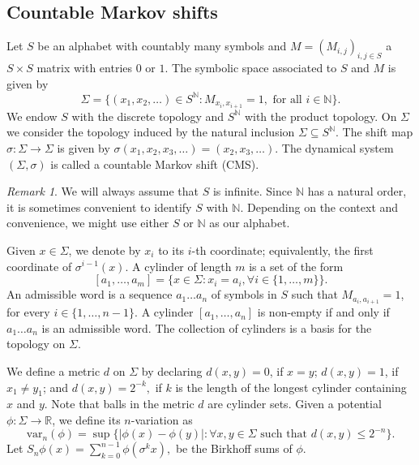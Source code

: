 \documentclass[letterpaper,11pt]{amsart}
\theoremstyle{plain}
\theoremstyle{plain}
\theoremstyle{definition}
\theoremstyle{remark}
\newtheorem{remark}{Remark}[section]
\def\R{{\mathbb R}}
\def\N{{\mathbb N}}
\begin{document}
\subsection{Countable Markov shifts} Let $S$ be an alphabet with countably many symbols and $M=(M_{i,j})_{i,j\in S}$  a $S\times S$ matrix  with entries $0$ or $1$. The symbolic space associated to $S$ and $M$  is given by$$\Sigma=\{(x_1,x_2,\ldots)\in S^{\N}: M_{x_i,x_{i+1}}=1,\text{ for all }i\in \N\}.$$
We endow $S$ with the discrete topology and $S^{\N}$ with the product topology. On $\Sigma$ we consider the topology induced by the natural inclusion $\Sigma\subseteq S^{\N}$. The shift map $\sigma:\Sigma\to\Sigma$ is given by $\sigma(x_1,x_2,x_3,\ldots)=(x_2,x_3,\ldots)$. The dynamical system $(\Sigma,\sigma)$ is called a {countable Markov shift} (CMS).

\begin{remark} We will always assume that $S$ is infinite. Since $\N$ has a natural order, it is sometimes convenient to identify $S$ with $\N$. Depending on the context and convenience, we might use either $S$ or $\N$ as our alphabet.
\end{remark}

Given $x\in \Sigma$, we denote by $x_i$ to its $i$-th coordinate; equivalently, the first coordinate of $\sigma^{i-1}(x)$. A cylinder of length $m$ is a set of the form $$[a_1,\ldots,a_{m}]=\{x\in\Sigma: x_i=a_i,\forall i\in\{1,\ldots ,m\}\}.$$
An admissible word is a sequence $a_1\ldots a_n$ of symbols in $S$ such that $M_{a_i,a_{i+1}}=1$, for every $i\in\{1,\ldots,n-1\}$. A cylinder $[a_1,\ldots,a_n]$ is non-empty if and only if $a_1\ldots a_n$ is an admissible word. The collection of cylinders is a basis for the topology on $\Sigma$. 

We define a metric $d$ on $\Sigma$ by declaring $d(x,y)=0$, if $x=y$; $d(x,y)=1$, if $x_1\ne y_1$; and $d(x,y)=2^{-k},$ if $k$ is the length of the longest cylinder containing $x$ and $y$. Note that balls in the metric $d$ are cylinder sets. Given a potential $\phi:\Sigma\to \R$, we define  its $n$-variation as
$$\text{var}_n(\phi)=\sup\{|\phi(x)-\phi(y)|: \forall x,y\in \Sigma \text{ such that }d(x,y)\le 2^{-n}\}.$$
Let $S_n\phi(x)=\sum_{k=0}^{n-1}\phi(\sigma^k x),$ be the Birkhoff sums of $\phi$. 
\end{document}
